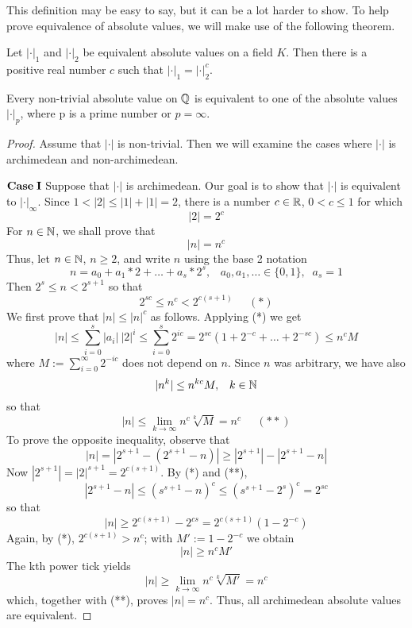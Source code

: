 \documentclass[a4paper]{article}
\begin{document}
This definition may be easy to say, but it can be a lot harder to 
show.  To help prove equivalence of absolute values, we will make
use of the following theorem.

\begin{theorem}
Let \(|\cdot|_1\) and \(|\cdot|_2\) be equivalent absolute values 
on a field \(K\).  Then there is a positive real number $c$ such 
that \(|\cdot|_1=|\cdot|_2^c\).
\end{theorem}

\begin{theorem}[Ostrowski]
Every non-trivial absolute value on \(\mathbb Q\) is equivalent to one of
the absolute values \(|\cdot|_p\), where p is a prime number or 
\(p=\infty\).
\end{theorem}
\begin{proof}
Assume that \(|\cdot|\) is non-trivial.  Then we will examine the 
cases where \(|\cdot|\) is archimedean and non-archimedean.

$\bf{Case\;I}$  Suppose that \(|\cdot|\) is archimedean. Our goal is to
show that \(|\cdot|\) is equivalent to \(|\cdot|_\infty\). Since 
$1<|2|\leq|1|+|1|=2$, there is a number $c\in\mathbb R$, $0<c\leq 1$ for
which
\[
	|2|=2^c
\]
For $n\in\mathbb N$, we shall prove that
\[
	|n|=n^c
\]
Thus, let $n\in\mathbb N$, $n\geq 2$, and write $n$ using the base 2
notation
\[
	n=a_0+a_1*2+\dots+a_s*2^s,\;\;\;a_0,a_1,\dots
    \in\{0,1\},\;\;a_s=1
\]
Then $2^s\leq n<2^{s+1}$ so that
\[
	2^{sc}\leq n^c<2^{c(s+1)}\;\;\;\;\;(*)
\]
We first prove that $|n|\leq|n|^c$ as follows.  Applying (*) we 
get
\[
  |n|\leq\sum_{i=0}^s|a_i|\:|2|^i\leq\sum_{i=0}^s2^{ic}=
  2^{sc}(1+2^{-c}+\dots+2^{-sc})\leq n^cM
\]
where $M:=\sum_{i=0}^\infty2^{-ic}$ does not depend on $n$.  Since 
$n$ was arbitrary, we have also
\[
  |n^k|\leq n^{kc}M,\;\;\;k\in\mathbb N
\]
so that
\[
	|n|\leq \lim_{k\to\infty}n^c\sqrt[k]{M}=n^c\;\;\;\;\;(**)
\]
To prove the opposite inequality, observe that 
\[
	|n|=|2^{s+1}-(2^{s+1}-n)|\geq |2^{s+1}|-|2^{s+1}-n|
\]
Now $|2^{s+1}|=|2|^{s+1}=2^{c(s+1)}$.  By (*) and (**),
\[
	|2^{s+1}-n|\leq(s^{s+1}-n)^c\leq (s^{s+1}-2^s)^c=2^{sc}
\]
so that
\[
	|n|\geq 2^{c(s+1)}-2^{cs}=2^{c(s+1)}(1-2^{-c})
\]
Again, by (*), $2^{c(s+1)}>n^c$; with $M':=1-2^{-c}$ we obtain
\[
	|n|\geq n^cM'
\]
The kth power tick yields
\[
	|n|\geq\lim_{k\to\infty}n^c\sqrt[k]{M'}=n^c
\]
which, together with (**), proves $|n|=n^c$.  Thus, all archimedean
absolute values are equivalent.


\end{proof}
\end{document}
